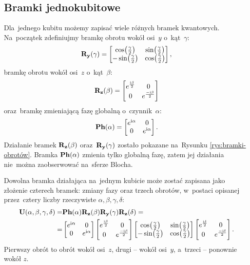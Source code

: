 \subsection{Bramki jednokubitowe}
Dla~jednego kubitu możemy zapisać wiele różnych bramek kwantowych.
Na~początek zdefiniujmy bramkę obrotu wokół osi~$y$ o~kąt~$\gamma$:
$$
	\mathbf{R_y}(\gamma)=
	\begin{bmatrix}
		\cos({\frac{\gamma}{2}})  & \sin({\frac{\gamma}{2}}) \\
		-\sin({\frac{\gamma}{2}}) & \cos({\frac{\gamma}{2}})
	\end{bmatrix},
$$
bramkę obrotu wokół osi~$z$ o~kąt~$\beta$:
$$
	\mathbf{R_z}(\beta)=
	\begin{bmatrix}
		e^{\frac{{\mathrm i}\beta}{2}} & 0                      \\
		0                     & e^{\frac{-{\mathrm i}\beta}{2}}
	\end{bmatrix}
$$
oraz~bramkę zmieniającą fazę globalną o~czynnik~$\alpha$:
$$
	\mathbf{Ph(\alpha)}=
	\begin{bmatrix}
		e^{{\mathrm i}\alpha} & 0            \\
		0            & e^{{\mathrm i}\alpha}
	\end{bmatrix}.
$$
Działanie bramek $\mathbf{R_z}(\beta)$ oraz~$\mathbf{R_y}(\gamma)$ zostało pokazane na~Rysunku \ref{rys:bramki-obrotów}.
Bramka $\mathbf{Ph(\alpha)}$ zmienia tylko globalną fazę, zatem jej działania nie~można zaobserwować na~sferze Blocha.

Dowolna bramka działająca na~jednym kubicie może zostać zapisana jako złożenie
czterech bramek: zmiany fazy oraz trzech obrotów, w~postaci
opisanej przez~cztery liczby rzeczywiste $\alpha, \beta, \gamma, \delta$:
\begin{equation*}
	\begin{split}
		\mathbf{U}(\alpha, \beta, \gamma, \delta)=&
		\mathbf{Ph}(\alpha)\mathbf{R_z}(\beta)\mathbf{R_y}(\gamma)\mathbf{R_z}(\delta)
		=\\
		=&
		\begin{bmatrix}
			e^{{\mathrm i}\alpha} & 0            \\
			0            & e^{{\mathrm i}\alpha}
		\end{bmatrix}
		\begin{bmatrix}
			e^{\frac{{\mathrm i}\beta}{2}} & 0                      \\
			0                     & e^{\frac{-{\mathrm i}\beta}{2}}
		\end{bmatrix}
		\begin{bmatrix}
			\cos({\frac{\gamma}{2}})  & \sin({\frac{\gamma}{2}}) \\
			-\sin({\frac{\gamma}{2}}) & \cos({\frac{\gamma}{2}})
		\end{bmatrix}
		\begin{bmatrix}
			e^{\frac{{\mathrm i}\delta}{2}} & 0                       \\
			0                      & e^{\frac{-{\mathrm i}\delta}{2}}
		\end{bmatrix}
		.
	\end{split}
\end{equation*}
Pierwszy obrót to obrót wokół osi~$z$, drugi -- wokół osi~$y$, a~trzeci -- ponownie wokół $z$.

